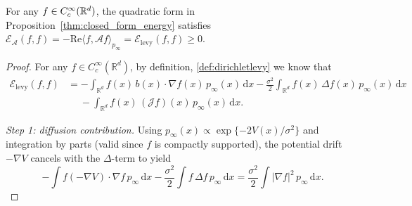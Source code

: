 \begin{remark}\label{rem:dissipation_equals_energy}
For any $f\in C_c^\infty(\mathbb{R}^d)$, the quadratic form in Proposition~\ref{thm:closed_form_energy}
satisfies $\mathcal E_{\mathcal A}(f,f)=-\mathrm{Re}\langle f,\mathcal A f\rangle_{p_\infty}
=\mathcal E_{\mathrm{levy}}(f,f)\ge 0$.
\end{remark}

\begin{proof}
For any $f\in C_c^\infty(\mathbb{R}^d)$, by definition, \ref{def:dirichletlevy} we know that 
\begin{align*}
\mathcal{E}_{\mathrm{levy}}(f,f)
&= -\int_{\mathbb{R}^d} f(x)\,b(x)\cdot\nabla f(x)\,p_\infty(x)\,\mathrm{d}x
-\frac{\sigma^2}{2}\int_{\mathbb{R}^d} f(x)\,\Delta f(x)\,p_\infty(x)\,\mathrm{d}x\\
&\quad\;-\int_{\mathbb{R}^d} f(x)\,(\mathcal{J}f)(x)\,p_\infty(x)\,\mathrm{d}x.
\end{align*}

\emph{Step 1: diffusion contribution.}
Using $p_\infty(x)\propto \exp\{-2V(x)/\sigma^2\}$ and integration by parts (valid since $f$ is compactly supported), the potential drift
$-\nabla V$ cancels with the $\Delta$-term to yield
\[
-\int f(-\nabla V)\cdot\nabla f\,p_\infty\,\mathrm{d}x
-\frac{\sigma^2}{2}\int f\,\Delta f\,p_\infty\,\mathrm{d}x
=
\frac{\sigma^2}{2}\int |\nabla f|^2\,p_\infty\,\mathrm{d}x.
\]


\end{proof}
